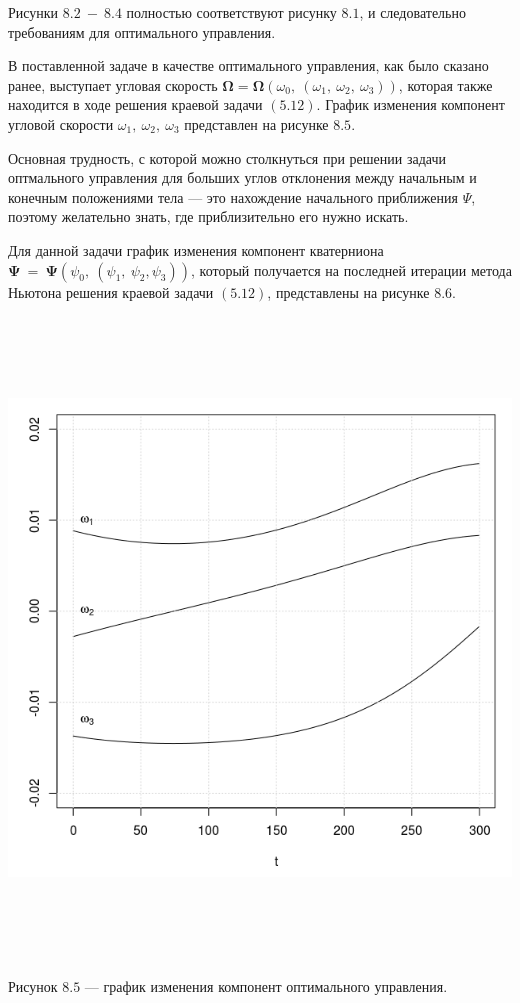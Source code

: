 \documentclass[14pt]{extreport}
\begin{document}
Рисунки $8.2\ -\ 8.4$ полностью соответствуют рисунку $8.1$, и следовательно требованиям для оптимального управления.

В поставленной задаче в качестве оптимального управления, как было сказано ранее, выступает угловая скорость
$\boldsymbol\Omega = \boldsymbol\Omega(\omega_0,\ (\omega_1,\ \omega_2,\ \omega_3))$, которая также находится в ходе решения краевой задачи $(5.12)$. График изменения
компонент угловой скорости $\omega_1,\ \omega_2,\ \omega_3$ представлен на рисунке $8.5$.

Основная трудность, с которой можно столкнуться при решении задачи оптмального управления для больших углов отклонения между начальным и конечным
положениями тела --- это нахождение начального приближения $\Psi$, поэтому желательно знать, где приблизительно его нужно искать. 

Для данной задачи график изменения компонент кватерниона $\boldsymbol\Psi\ =\ \boldsymbol\Psi(\psi_0,\ (\psi_1,\ \psi_2, \psi_3))$, который получается на последней итерации
метода Ньютона решения краевой задачи $(5.12)$, представлены на рисунке $8.6$.

\begin{center}
\vspace*{50px}
\includegraphics[width=17cm, height=17cm]{o300.png}

Рисунок $8.5$ --- график изменения компонент оптимального управления.
\end{center}
\end{document}
